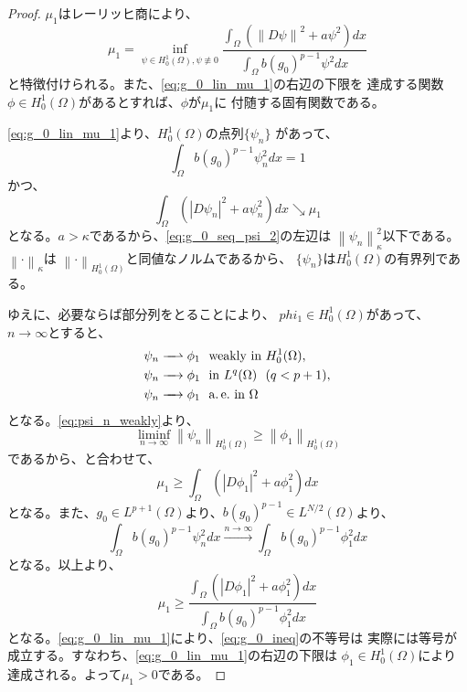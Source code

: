 \begin{proof}
 $\mu_1$はレーリッヒ商により、
 \begin{equation}
  \mu_1 = \inf_{\psi \in H_0^1(\Omega), \psi \not\equiv 0}
   \frac{\displaystyle \int_\Omega \left( \left\| D \psi \right\|^2 + a \psi^2
                     \right) dx}{\displaystyle \int_\Omega b (g_0)^{p-1} \psi^2 dx}
   \label{eq:g_0_lin_mu_1}
 \end{equation}
 と特徴付けられる。また、\eqref{eq:g_0_lin_mu_1}の右辺の下限を
 達成する関数$\phi \in H_0^1(\Omega)$があるとすれば、$\phi$が$\mu_1$に
 付随する固有関数である。

 \eqref{eq:g_0_lin_mu_1}より、$H_0^1(\Omega)$の点列$\{ \psi_n \}$
 があって、
 \begin{equation}
  \int_\Omega b(g_0)^{p-1} \psi_n^2 dx = 1 \label{eq:g_0_seq_psi_1}
 \end{equation}
 かつ、
 \begin{equation}
  \int_\Omega \left( \left| D\psi_n \right|^2 + a \psi_n^2 \right) dx
   \searrow \mu_1 \label{eq:g_0_seq_psi_2}
 \end{equation}
 となる。$a > \kappa$であるから、\eqref{eq:g_0_seq_psi_2}の左辺は
 $\left\| \psi_n \right\|_\kappa^2$以下である。
 $\left\| \cdot \right\|_\kappa$は
 $\left\| \cdot \right\|_{H_0^1(\Omega)}$と同値なノルムであるから、
 $\{ \psi_n \}$は$H_0^1(\Omega)$の有界列である。
 
 ゆえに、必要ならば部分列をとることにより、
 $phi_1 \in H_0^1(\Omega)$があって、$n \to \infty$とすると、
 \begin{align}
  \psi_n \xrightharpoonup{ \mbox{ ~ } } \phi_1 & \ \ \text{weakly~} \tin
  H_0^1(\Omega), \label{eq:psi_n_weakly} \\
  \psi_n \xrightarrow{ \mbox{ ~ } } \phi_1 & \ \ \tin L^q(\Omega) \notag \ \
   (q < p+1), \label{eq:psi_n_L^q} \\
  \psi_n \xrightarrow{ \mbox{ ~ } } \phi_1 & \ \ \ae \tin \Omega 
    \notag
 \end{align}
 となる。\eqref{eq:psi_n_weakly}より、
 \[
  \liminf_{n \to \infty} \left\| \psi_n \right\|_{H_0^1(\Omega)}
 \geq \left\| \phi_1 \right\|_{H_0^1(\Omega)}
 \]
 であるから、\label{eq:psi_n_L^q}と合わせて、 
 \[
  \mu_1 \geq \int_\Omega \left( \left| D\phi_1 \right|^2 + a\phi_1^2
 \right) dx
 \]
 となる。また、$g_0 \in L^{p+1}(\Omega)$より、$b (g_0)^{p-1} \in
 L^{N/2} (\Omega)$より、
 \[
  \int_\Omega b(g_0)^{p-1} \psi_n^2 dx \xrightarrow{n \to \infty}
 \int_{\Omega} b(g_0)^{p-1} \phi_1^2 dx
 \]
 となる。以上より、
 \begin{equation}
  \mu_1 \geq \frac{\displaystyle \int_\Omega \left( \left| D\phi_1 \right|^2 + a\phi_1^2
  \right) dx}{\displaystyle \int_{\Omega} b(g_0)^{p-1} \phi_1^2 dx} \label{eq:g_0_ineq}
 \end{equation}
 となる。\eqref{eq:g_0_lin_mu_1}により、\eqref{eq:g_0_ineq}の不等号は
 実際には等号が成立する。すなわち、\eqref{eq:g_0_lin_mu_1}の右辺の下限は
 $\phi_1 \in H_0^1(\Omega)$により達成される。よって$\mu_1 > 0$である。
 

\end{proof}
